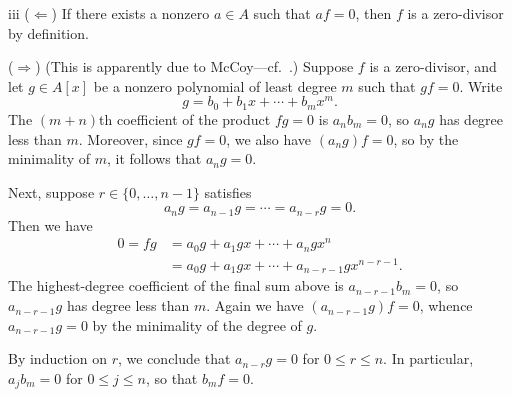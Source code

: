 \begin{partsolution}{1}{2}{iii}
(\(\Leftarrow\))
If there exists a nonzero \(a \in A\) such that \(a f = 0\), then \(f\) is a zero-divisor by definition.

(\(\Rightarrow\))
(This is apparently due to McCoy---cf.~\cite[Theorem 2]{McCoyDivisorsOfZero}.)
Suppose \(f\) is a zero-divisor, and let \(g \in A[x]\) be a nonzero polynomial of least degree \(m\) such that \(g f = 0\).
Write
\begin{equation*}
g = b_0 + b_1 x + \cdots + b_m x^m.
\end{equation*}
The \((m+n)\)th coefficient of the product \(f g = 0\) is \(a_n b_m = 0\), so \(a_n g\) has degree less than \(m\).
Moreover, since \(g f = 0\), we also have \((a_n g) f = 0\), so by the minimality of \(m\), it follows that \(a_n g = 0\).

Next, suppose \(r\in\{0,\ldots,n-1\}\) satisfies
\begin{equation*}
a_n g
= a_{n-1} g
= \cdots
= a_{n-r} g
= 0.
\end{equation*}
Then we have
\begin{align*}
0
= f g
&= a_0 g + a_1 g x + \cdots + a_n g x^n
\\&= a_0 g + a_1 g x + \cdots + a_{n-r-1} g x^{n-r-1}.
\end{align*}
The highest-degree coefficient of the final sum above is \(a_{n-r-1} b_m = 0\), so \(a_{n-r-1} g\) has degree less than \(m\).
Again we have \((a_{n-r-1} g) f = 0\), whence \(a_{n-r-1} g = 0\) by the minimality of the degree of \(g\).

By induction on \(r\), we conclude that \(a_{n-r} g = 0\) for \(0 \leq r \leq n\).
In particular, \(a_j b_m = 0\) for \(0\leq j \leq n\), so that \(b_m f = 0\).
\end{partsolution}

